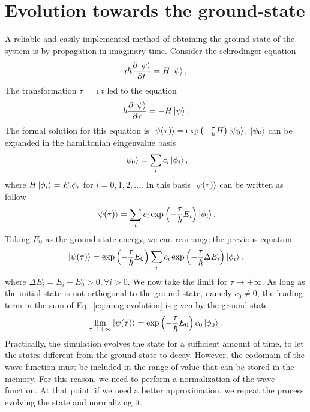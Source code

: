 \section{Evolution towards the ground-state}
A reliable and easily-implemented method of obtaining the ground state of the
system is by propagation in imaginary time. Consider the schr\"odinger equation
\begin{equation}
\imath \hbar \frac{\partial \ket{\psi}}{\partial t} = H \ket{\psi},
\end{equation}
The transformation $ \tau = \imath t$ led to the equation
\begin{equation}
\hbar \frac{\partial \ket{\psi}}{\partial \tau} = - H \ket{\psi}.
\end{equation}
The formal solution for this equation is $\ket{\psi(\tau)} = \exp\left( -\frac{\tau}{\hbar} H \right) \ket{\psi_0}$. $\ket{\psi_0}$ can be expanded in the hamiltonian eingenvalue basis
\begin{equation}
\ket{\psi_0} = \sum_i c_i \ket{\phi_i},
\end{equation}
where $H \ket{\phi_i} = E_i \phi_i$ for $i = 0,1,2,\ldots$. In this basis $\ket{\psi(\tau)}$ can be written as follow
\begin{equation}
\ket{\psi(\tau)} = \sum_i c_i \exp\left( -\frac{\tau}{\hbar} E_i \right) \ket{\phi_i}.
\end{equation}
Taking $E_0$ as the ground-state energy, we can rearrange the previous equation
\begin{equation} \label{eq:imag-evolution}
\ket{\psi(\tau)} = \exp \left( -\frac{\tau}{\hbar} E_0 \right) \sum_i c_i  \exp\left( -\frac{\tau}{\hbar} \Delta E_i \right) \ket{\phi_i}.
\end{equation}
where $\Delta E_i = E_i - E_0 > 0,  \forall i > 0$. We now take the limit for $\tau \rightarrow +\infty$. As long as the initial state is not orthogonal to the ground state, namely $c_0 \neq 0$, the leading term in the sum of Eq.~\eqref{eq:imag-evolution} is given by the ground state
\begin{equation}
\lim_{\tau \rightarrow +\infty} \ket{\psi(\tau)} = \exp \left( -\frac{\tau}{\hbar} E_0 \right) c_0 \ket{\phi_0}.
\end{equation}
Practically, the simulation evolves the state for a sufficient amount of time, to let the states different from the ground state to decay. However, the codomain of the wave-function must be included in the range of value that can be stored in the memory. For this reason, we need to perform a normalization of the wave function. At that point, if we need a better approximation, we repeat the process evolving the state and normalizing it.


